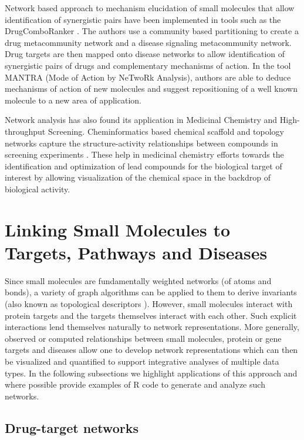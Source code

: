 \documentclass[]{book}
\begin{document}
Network based approach to mechanism elucidation of small molecules that allow identification of synergistic pairs have been implemented in tools such as the DrugComboRanker \cite{huang2014drugcomboranker}. The authors use a community based partitioning to create a drug metacommunity network and a disease signaling metacommunity network. Drug targets are then mapped onto disease networks to allow identification of synergistic pairs of drugs and complementary mechanisms of action.
In the tool MANTRA (Mode of Action by NeTwoRk Analysis)\cite{iorio2010discovery}, authors are able to deduce mechanisms of action of new molecules and suggest repositioning of a well known molecule to a new area of application.

Network analysis has also found its application in Medicinal Chemistry and High-throughput Screening. Cheminformatics based chemical scaffold and topology networks capture the structure-activity relationships between compounds in screening experiments \cite{varin2011mining}. These help in medicinal chemistry efforts towards the identification and optimization of lead compounds for the  biological target of interest by allowing visualization of the chemical space in the backdrop of biological activity. 
  

\section{Linking Small Molecules to Targets, Pathways and Diseases}
\label{sec:link-small-molec}

Since small molecules are fundamentally weighted networks (of atoms
and bonds), a variety of graph algorithms can be applied to them to
derive invariants (also known as topological descriptors
\cite{Guha:2012vn}). However, small molecules interact with protein
targets and the targets themselves interact with each other. Such
explicit interactions lend themselves naturally to network
representations. More generally, observed or computed relationships
between small molecules, protein or gene targets and diseases allow
one to develop network representations which can then be visualized
and quantified to support integrative analyses of multiple data
types. In the following subsections we highlight applications of this
approach and where possible provide examples of R code to generate and
analyze such networks.

\subsection{Drug-target networks}
\label{sec:drug-target-networks}
\end{document}
